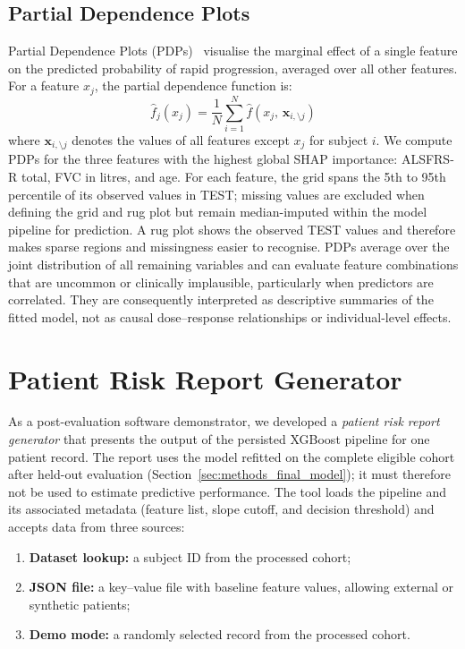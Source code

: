 \subsection{Partial Dependence Plots}
\label{subsec:methods_pdp}
Partial Dependence Plots (PDPs)~\cite{friedman2001pdp} visualise the marginal effect of a single feature on the predicted probability of rapid progression, averaged over all other features.
For a feature $x_j$, the partial dependence function is:
\begin{equation}
  \hat{f}_j(x_j) = \frac{1}{N} \sum_{i=1}^{N} \hat{f}(x_j,\, \mathbf{x}_{i,\setminus j})
  \label{eq:pdp}
\end{equation}
where $\mathbf{x}_{i,\setminus j}$ denotes the values of all features except $x_j$ for subject $i$.
We compute \glspl{PDP} for the three features with the highest global \gls{SHAP} importance: \gls{ALSFRS-R} total, \gls{FVC} in litres, and age.
For each feature, the grid spans the 5th to 95th percentile of its observed values in TEST; missing values are excluded when defining the grid and rug plot but remain median-imputed within the model pipeline for prediction.
A rug plot shows the observed TEST values and therefore makes sparse regions and missingness easier to recognise.
PDPs average over the joint distribution of all remaining variables and can evaluate feature combinations that are uncommon or clinically implausible, particularly when predictors are correlated.
They are consequently interpreted as descriptive summaries of the fitted model, not as causal dose--response relationships or individual-level effects.

\section{Patient Risk Report Generator}
\label{sec:methods_patient_report}

As a post-evaluation software demonstrator, we developed a \textit{patient risk report generator} that presents the output of the persisted XGBoost pipeline for one patient record.
The report uses the model refitted on the complete eligible cohort after held-out evaluation (Section~\ref{sec:methods_final_model}); it must therefore not be used to estimate predictive performance.
The tool loads the pipeline and its associated metadata (feature list, slope cutoff, and decision threshold) and accepts data from three sources:
\begin{enumerate}
  \item \textbf{Dataset lookup:} a subject ID from the processed cohort;
  \item \textbf{\gls{JSON} file:} a key--value file with baseline feature values, allowing external or synthetic patients;
  \item \textbf{Demo mode:} a randomly selected record from the processed cohort.
\end{enumerate}

